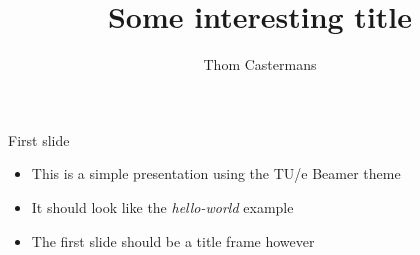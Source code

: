 \documentclass[12pt, aspectratio=169]{beamer} %
\title{Some interesting title}
\author{Thom Castermans}
\begin{document}
\begin{titleframe}
\end{titleframe}

\begin{frame}{First slide}
  \begin{itemize}
    \item This is a simple presentation using the TU/e Beamer theme
    \item It should look like the \textit{hello-world} example
    \item The first slide should be a title frame however
  \end{itemize}
\end{frame}
\end{document}

